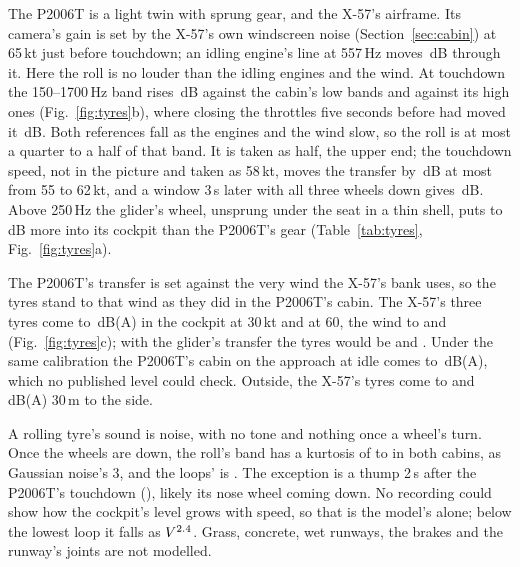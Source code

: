 \documentclass[10pt,a4paper,twocolumn]{article}
\begin{document}
The P2006T is a light twin with sprung gear, and the X-57's airframe. Its camera's gain is set by the X-57's own windscreen noise (Section~\ref{sec:cabin}) at 65\,kt just before touchdown; an idling engine's line at 557\,Hz moves \NTyLine\,dB through it. Here the roll is no louder than the idling engines and the wind. At touchdown the 150--1700\,Hz band rises \NTyRiseLow\,dB against the cabin's low bands and \NTyRiseHigh{} against its high ones (Fig.~\ref{fig:tyres}b), where closing the throttles five seconds before had moved it \NTyThrottles\,dB. Both references fall as the engines and the wind slow, so the roll is at most a quarter to a half of that band. It is taken as half, the upper end; the touchdown speed, not in the picture and taken as 58\,kt, moves the transfer by \NTySpeed\,dB at most from 55 to 62\,kt, and a window 3\,s later with all three wheels down gives \NTyLater\,dB. Above 250\,Hz the glider's wheel, unsprung under the seat in a thin shell, puts \NTyLessLo{} to \NTyLessHi\,dB more into its cockpit than the P2006T's gear (Table~\ref{tab:tyres}, Fig.~\ref{fig:tyres}a).

The P2006T's transfer is set against the very wind the X-57's bank uses, so the tyres stand to that wind as they did in the P2006T's cabin. The X-57's three tyres come to \NTyCockThirty\,dB(A) in the cockpit at 30\,kt and \NTyCockSixty{} at 60, the wind to \NTyWindThirty{} and \NTyWindSixty{} (Fig.~\ref{fig:tyres}c); with the glider's transfer the tyres would be \NTyCockAskThirty{} and \NTyCockAskSixty. Under the same calibration the P2006T's cabin on the approach at idle comes to \NTyApproach\,dB(A), which no published level could check. Outside, the X-57's tyres come to \NTySideThirty{} and \NTySideSixty\,dB(A) 30\,m to the side.

A rolling tyre's sound is noise, with no tone and nothing once a wheel's turn. Once the wheels are down, the roll's band has a kurtosis of \NTyKurtLo{} to \NTyKurtHi{} in both cabins, as Gaussian noise's 3, and the loops' is \NTyKurtLoop. The exception is a thump 2\,s after the P2006T's touchdown (\NTyThump), likely its nose wheel coming down. No recording could show how the cockpit's level grows with speed, so that is the model's alone; below the lowest loop it falls as $V^{2.4}$. Grass, concrete, wet runways, the brakes and the runway's joints are not modelled.
\end{document}
